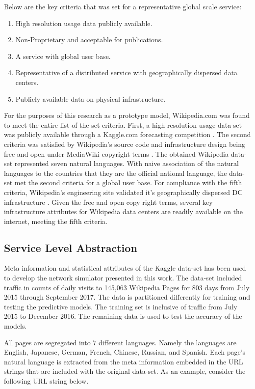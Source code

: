     Below are the key criteria that was set for a representative global scale service:
    \begin{enumerate}
        \item High resolution usage data publicly available.
        \item Non-Proprietary and acceptable for publications. 
        \item A service with global user base.
        \item Representative of a distributed service with geographically dispersed data centers.
        \item Publicly available data on physical infrastructure.
    \end{enumerate}
    
    For the purposes of this research as a prototype model, Wikipedia.com was found to meet the entire list of the set criteria. First, a high resolution usage data-set was publicly available through a Kaggle.com forecasting competition \cite{kaggle17}. The second criteria was satisfied by Wikipedia's source code and infrastructure design being free and open under MediaWiki copyright terms \cite{wiki_media}. The obtained Wikipedia data-set represented seven natural languages. With naive association of the natural languages to the countries that they are the official national language, the data-set met the second criteria for a global user base. For compliance with the fifth criteria, Wikipedia's engineering site validated it's geographically dispersed DC infrastructure \cite{wiki_locs}. Given the free and open copy right terms, several key infrastructure attributes for Wikipedia data centers are readily available on the internet, meeting the fifth criteria.
    
\subsection{Service Level Abstraction}
    
    Meta information and statistical attributes of the Kaggle data-set has been used to develop the network simulator presented in this work. The data-set included traffic in counts of daily visits to 145,063 Wikipedia Pages for 803 days from July 2015 through September 2017. The data is partitioned differently for training and testing the predictive models. The training set is inclusive of traffic from July 2015 to December 2016. The remaining data is used to test the accuracy of the models. 
    
    All pages are segregated into 7 different languages. Namely the languages are English, Japanese, German, French, Chinese, Russian, and Spanish. Each page's natural language is extracted from the meta information embedded in the URL strings that are included with the original data-set. As an example, consider the following URL string below.
    
